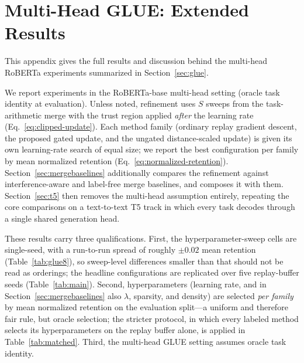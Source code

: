 \documentclass{article} %
\begin{document}
\iffalse
\section{Multi-Head GLUE: Extended Results}
\label{app:glue}
This appendix gives the full results and discussion behind the multi-head RoBERTa experiments summarized in Section~\ref{sec:glue}.

We report experiments in the RoBERTa-base multi-head setting (oracle task identity at evaluation). Unless noted, refinement uses $S$ sweeps from the task-arithmetic merge with the trust region applied \emph{after} the learning rate (Eq.~\eqref{eq:clipped-update}). Each method family (ordinary replay gradient descent, the proposed gated update, and the ungated distance-scaled update) is given its own learning-rate search of equal size; we report the best configuration per family by mean normalized retention (Eq.~\eqref{eq:normalized-retention}). Section~\ref{sec:mergebaselines} additionally compares the refinement against interference-aware and label-free merge baselines, and composes it with them. Section~\ref{sec:t5} then removes the multi-head assumption entirely, repeating the core comparisons on a text-to-text T5 track in which every task decodes through a single shared generation head.

These results carry three qualifications. First, the hyperparameter-sweep cells are single-seed, with a run-to-run spread of roughly $\pm0.02$ mean retention (Table~\ref{tab:glue8}), so sweep-level differences smaller than that should not be read as orderings; the headline configurations are replicated over five replay-buffer seeds (Table~\ref{tab:main}). Second, hyperparameters (learning rate, and in Section~\ref{sec:mergebaselines} also $\lambda$, sparsity, and density) are selected \emph{per family} by mean normalized retention on the evaluation split---a uniform and therefore fair rule, but oracle selection; the stricter protocol, in which every labeled method selects its hyperparameters on the replay buffer alone, is applied in Table~\ref{tab:matched}. Third, the multi-head GLUE setting assumes oracle task identity.
\end{document}
